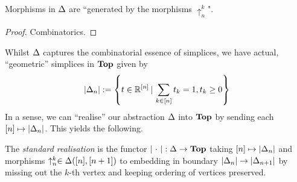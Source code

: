 \documentclass{article}
\begin{document}
\begin{lem}

  Morphisms in $\Delta$ are ``generated by the morphisms $\uparrow_n^k$".
\end{lem}
\begin{proof}
  Combinatorics.
\end{proof}

\begin{rmk}
  Whilst $\Delta$ captures the combinatorial essence of simplices,
  we have actual, ``geometric'' simplices in $\mathbf{Top}$ given by 
  \[
    \left\vert \Delta_n \right\vert := 
    \left\{t \in \mathbb{R}^{[n]} \,|\, \sum_{k \in [n]} t_k = 1, t_k \geq 0\right\}
  \]
  In a sense, we can ``realise'' our abstraction $\Delta$ into $\mathbf{Top}$
  by sending each $[n] \mapsto \left\vert \Delta_n \right\vert$. 
  This yields the following. 
\end{rmk}

\begin{dfn}
  
  The \emph{standard realisation} is
  the functor $\left\vert \,\,\cdot\,\, \right\vert : \Delta \to \mathbf{Top}$
  taking $[n] \mapsto \left\vert \Delta_n \right\vert$ and 
  morphisms $\uparrow_n^k \in \Delta([n],[n+1])$ to 
  embedding in boundary $\left\vert \Delta_n \right\vert \to \left\vert \Delta_{n+1} \right\vert$ by 
  missing out the $k$-th vertex and keeping 
  ordering of vertices preserved. 
\end{dfn}
\end{document}
